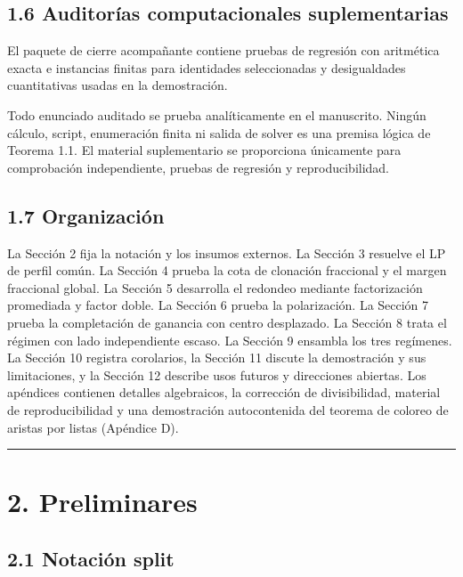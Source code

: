 \documentclass[
  11pt,
]{article}
\begin{document}
\subsection{1.6 Auditorías computacionales suplementarias}\label{auditoruxedas-computacionales-suplementarias}

El paquete de cierre acompañante contiene pruebas de regresión con aritmética exacta e instancias finitas para identidades seleccionadas y desigualdades cuantitativas usadas en la demostración.

Todo enunciado auditado se prueba analíticamente en el manuscrito. Ningún cálculo, script, enumeración finita ni salida de solver es una premisa lógica de Teorema 1.1. El material suplementario se proporciona únicamente para comprobación independiente, pruebas de regresión y reproducibilidad.

\subsection{1.7 Organización}\label{organizaciuxf3n}

La Sección 2 fija la notación y los insumos externos. La Sección 3 resuelve el LP de perfil común. La Sección 4 prueba la cota de clonación fraccional y el margen fraccional global. La Sección 5 desarrolla el redondeo mediante factorización promediada y factor doble. La Sección 6 prueba la polarización. La Sección 7 prueba la completación de ganancia con centro desplazado. La Sección 8 trata el régimen con lado independiente escaso. La Sección 9 ensambla los tres regímenes. La Sección 10 registra corolarios, la Sección 11 discute la demostración y sus limitaciones, y la Sección 12 describe usos futuros y direcciones abiertas. Los apéndices contienen detalles algebraicos, la corrección de divisibilidad, material de reproducibilidad y una demostración autocontenida del teorema de coloreo de aristas por listas (Apéndice D).

\begin{center}\rule{0.5\linewidth}{0.5pt}\end{center}

\section{2. Preliminares}\label{preliminares}

\subsection{2.1 Notación split}\label{notaciuxf3n-split}
\end{document}
